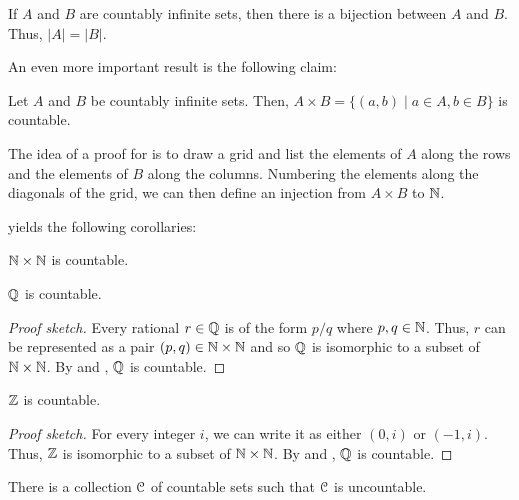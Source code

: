 \documentclass[11pt,usenames, dvipsnames]{article}
\begin{document}
\begin{claim}
  If $A$ and $B$ are countably infinite sets, then there is a bijection between $A$ and $B$. Thus, $|A| = |B|$.
\end{claim}

An even more important result is the following claim:

\begin{claim}
  Let $A$ and $B$ be countably infinite sets. Then, $A \times B = \{(a, b) \mid a \in A, b \in B\}$ is countable.
\end{claim}

The idea of a proof for  is to draw a grid and list the elements of $A$ along the rows and the elements of $B$ along the columns. Numbering the elements along the diagonals of the grid, we can then define an injection from $A \times B$ to $\mathbb{N}$.

 yields the following corollaries:

\begin{corollary}
  $\mathbb{N} \times \mathbb{N}$ is countable.
\end{corollary}

\begin{corollary}
  $\mathbb{Q}$ is countable.
\end{corollary}

\begin{proof}[Proof sketch]
  Every rational $r \in \mathbb{Q}$ is of the form $p/q$ where $p, q \in \mathbb{N}$. Thus, $r$ can be represented as a pair $(p, q) \in \mathbb{N} \times \mathbb{N}$ and so $\mathbb{Q}$ is isomorphic to a subset of $\mathbb{N} \times \mathbb{N}$. By  and , $\mathbb{Q}$ is countable.
\end{proof}

\begin{corollary}
  $\mathbb{Z}$ is countable.
\end{corollary}

\begin{proof}[Proof sketch]
  For every integer $i$, we can write it as either $(0, i)$ or $(-1, i)$. Thus, $\mathbb{Z}$ is isomorphic to a subset of $\mathbb{N} \times \mathbb{N}$. By  and , $\mathbb{Q}$ is countable.
\end{proof}

\begin{theorem}
  There is a collection $\conn$ of countable sets such that $\conn$ is uncountable.
\end{theorem}
\end{document}
